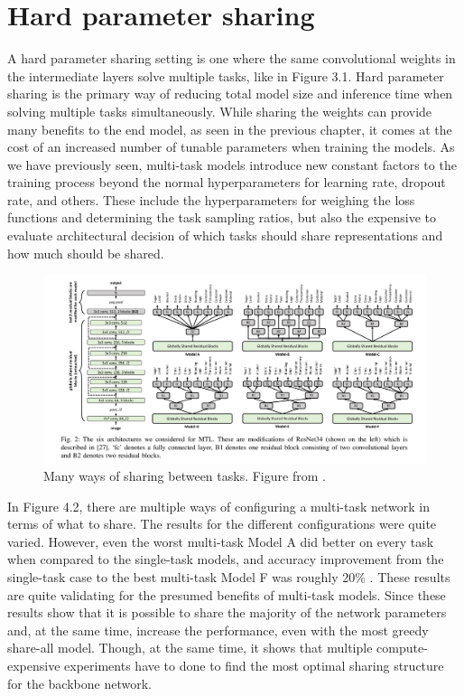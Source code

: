 \section{Hard parameter sharing}
A hard parameter sharing setting is one where the same convolutional weights in the intermediate layers solve multiple tasks, like in Figure 3.1.
Hard parameter sharing is the primary way of reducing total model size and inference time when solving multiple tasks simultaneously.
While sharing the weights can provide many benefits to the end model, as seen in the previous chapter, it comes at the cost of an increased number of tunable parameters when training the models. 
As we have previously seen, multi-task models introduce new constant factors to the training process beyond the normal hyperparameters for learning rate, dropout rate, and others.
These include the hyperparameters for weighing the loss functions and determining the task sampling ratios, but also the expensive to evaluate architectural decision of which tasks should share representations and how much should be shared.

\begin{figure}[h!] 
\centering 
\includegraphics[width=1\textwidth]{imgs/multipleShares.png}
\caption{Many ways of sharing between tasks. Figure from \citep{healthyDrink}.\label{fig:params}}
\end{figure}

In Figure 4.2, there are multiple ways of configuring a multi-task network in terms of what to share.
The results for the different configurations were quite varied. 
However, even the worst multi-task Model A did better on every task when compared to the single-task models, and accuracy improvement from the single-task case to the best multi-task Model F was roughly 20\% \citep{healthyDrink}.
These results are quite validating for the presumed benefits of multi-task models.
Since these results show that it is possible to share the majority of the network parameters and, at the same time, increase the performance, even with the most greedy share-all model.
Though, at the same time, it shows that multiple compute-expensive experiments have to done to find the most optimal sharing structure for the backbone network.

